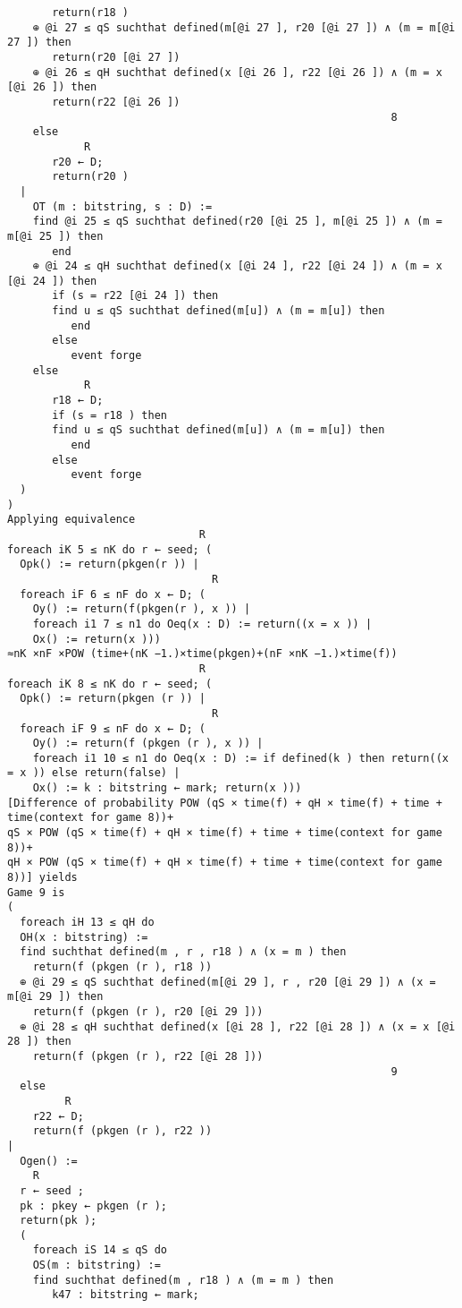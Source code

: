 \documentclass[a4paper,openright,twoside,12pt]{report}
\begin{document}
\begin{verbatim}
       return(r18 )
    ⊕ @i 27 ≤ qS suchthat defined(m[@i 27 ], r20 [@i 27 ]) ∧ (m = m[@i 27 ]) then
       return(r20 [@i 27 ])
    ⊕ @i 26 ≤ qH suchthat defined(x [@i 26 ], r22 [@i 26 ]) ∧ (m = x [@i 26 ]) then
       return(r22 [@i 26 ])
                                                            8
    else
            R
       r20 ← D;
       return(r20 )
  |
    OT (m : bitstring, s : D) :=
    find @i 25 ≤ qS suchthat defined(r20 [@i 25 ], m[@i 25 ]) ∧ (m = m[@i 25 ]) then
       end
    ⊕ @i 24 ≤ qH suchthat defined(x [@i 24 ], r22 [@i 24 ]) ∧ (m = x [@i 24 ]) then
       if (s = r22 [@i 24 ]) then
       find u ≤ qS suchthat defined(m[u]) ∧ (m = m[u]) then
          end
       else
          event forge
    else
            R
       r18 ← D;
       if (s = r18 ) then
       find u ≤ qS suchthat defined(m[u]) ∧ (m = m[u]) then
          end
       else
          event forge
  )
)
Applying equivalence
                              R
foreach iK 5 ≤ nK do r ← seed; (
  Opk() := return(pkgen(r )) |
                                R
  foreach iF 6 ≤ nF do x ← D; (
    Oy() := return(f(pkgen(r ), x )) |
    foreach i1 7 ≤ n1 do Oeq(x : D) := return((x = x )) |
    Ox() := return(x )))
≈nK ×nF ×POW (time+(nK −1.)×time(pkgen)+(nF ×nK −1.)×time(f))
                              R
foreach iK 8 ≤ nK do r ← seed; (
  Opk() := return(pkgen (r )) |
                                R
  foreach iF 9 ≤ nF do x ← D; (
    Oy() := return(f (pkgen (r ), x )) |
    foreach i1 10 ≤ n1 do Oeq(x : D) := if defined(k ) then return((x = x )) else return(false) |
    Ox() := k : bitstring ← mark; return(x )))
[Difference of probability POW (qS × time(f) + qH × time(f) + time + time(context for game 8))+
qS × POW (qS × time(f) + qH × time(f) + time + time(context for game 8))+
qH × POW (qS × time(f) + qH × time(f) + time + time(context for game 8))] yields
Game 9 is
(
  foreach iH 13 ≤ qH do
  OH(x : bitstring) :=
  find suchthat defined(m , r , r18 ) ∧ (x = m ) then
    return(f (pkgen (r ), r18 ))
  ⊕ @i 29 ≤ qS suchthat defined(m[@i 29 ], r , r20 [@i 29 ]) ∧ (x = m[@i 29 ]) then
    return(f (pkgen (r ), r20 [@i 29 ]))
  ⊕ @i 28 ≤ qH suchthat defined(x [@i 28 ], r22 [@i 28 ]) ∧ (x = x [@i 28 ]) then
    return(f (pkgen (r ), r22 [@i 28 ]))
                                                            9
  else
         R
    r22 ← D;
    return(f (pkgen (r ), r22 ))
|
  Ogen() :=
    R
  r ← seed ;
  pk : pkey ← pkgen (r );
  return(pk );
  (
    foreach iS 14 ≤ qS do
    OS(m : bitstring) :=
    find suchthat defined(m , r18 ) ∧ (m = m ) then
       k47 : bitstring ← mark;

\end{verbatim}
\end{document}
